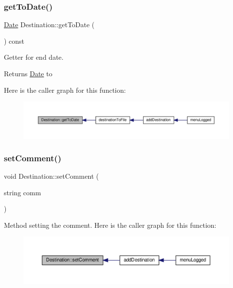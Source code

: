 \subsubsection{\texorpdfstring{get\+To\+Date()}{getToDate()}}
{\footnotesize\ttfamily \hyperlink{class_date}{Date} Destination\+::get\+To\+Date (\begin{DoxyParamCaption}{ }\end{DoxyParamCaption}) const\hspace{0.3cm}{\ttfamily [inline]}}

Getter for end date. \begin{DoxyReturn}{Returns}
\hyperlink{class_date}{Date} to 
\end{DoxyReturn}
Here is the caller graph for this function\+:\nopagebreak
\begin{figure}[H]
\begin{center}
\leavevmode
\includegraphics[width=350pt]{class_destination_a6a98c7e1c0ffa4b821d3f7dd85cad3dd_icgraph}
\end{center}
\end{figure}
\mbox{\label{class_destination_a08199ade6e0bf7488d796d85dec8cfd9}} 
\subsubsection{\texorpdfstring{set\+Comment()}{setComment()}}
{\footnotesize\ttfamily void Destination\+::set\+Comment (\begin{DoxyParamCaption}\item[{string}]{comm }\end{DoxyParamCaption})}

Method setting the comment. Here is the caller graph for this function\+:\nopagebreak
\begin{figure}[H]
\begin{center}
\leavevmode
\includegraphics[width=350pt]{class_destination_a08199ade6e0bf7488d796d85dec8cfd9_icgraph}
\end{center}
\end{figure}
\mbox{\label{class_destination_a9cafaaf83be9ea548401caf2a2c4d839}} 
